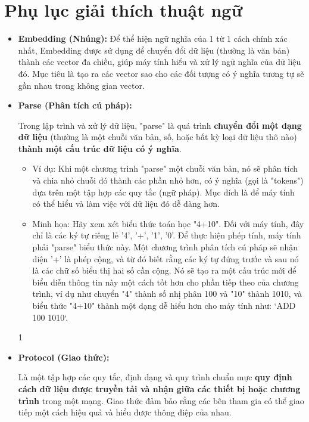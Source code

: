 \documentclass[11pt]{article}
\begin{document}
\section{Phụ lục giải thích thuật ngữ} \label{app:glossary}
\begin{itemize}
	\item \textbf{Embedding (Nhúng):} \label{app:embedding} Để thể hiện ngữ nghĩa của 1 từ 1 cách chính xác nhất, Embedding được sử dụng để chuyển đổi dữ liệu (thường là văn bản) thành các vector đa chiều, giúp máy tính hiểu và xử lý ngữ nghĩa của dữ liệu đó. Mục tiêu là tạo ra các vector sao cho các đối tượng có ý nghĩa tương tự sẽ gần nhau trong không gian vector.

    \item \textbf{Parse (Phân tích cú pháp):} \label{app:parse}
    \begin{boxC}
        Trong lập trình và xử lý dữ liệu, "parse" là quá trình \textbf{chuyển đổi một dạng dữ liệu} (thường là một chuỗi văn bản, số, hoặc bất kỳ loại dữ liệu thô nào) \textbf{thành một cấu trúc dữ liệu có ý nghĩa}.
        \begin{itemize}
            \item Ví dụ: Khi một chương trình "parse" một chuỗi văn bản, nó sẽ phân tích và chia nhỏ chuỗi đó thành các phần nhỏ hơn, có ý nghĩa (gọi là "tokens") dựa trên một tập hợp các quy tắc (ngữ pháp). Mục đích là để máy tính có thể hiểu và làm việc với dữ liệu đó dễ dàng hơn.
            \item Minh họa: Hãy xem xét biểu thức toán học "4+10". Đối với máy tính, đây chỉ là các ký tự riêng lẻ '4', '+', '1', '0'. Để thực hiện phép tính, máy tính phải "parse" biểu thức này. Một chương trình phân tích cú pháp sẽ nhận diện '+' là phép cộng, và từ đó biết rằng các ký tự đứng trước và sau nó là các chữ số biểu thị hai số cần cộng. Nó sẽ tạo ra một cấu trúc mới để biểu diễn thông tin này một cách tốt hơn cho phần tiếp theo của chương trình, ví dụ như chuyển "4" thành số nhị phân 100 và "10" thành 1010, và biểu thức "4+10" thành một dạng dễ hiểu hơn cho máy tính như: `ADD 100 1010`.
        \end{itemize}
    \end{boxC}
1
    \item \textbf{Protocol (Giao thức):} \label{app:protocol}
    \begin{boxC}
        Là một tập hợp các quy tắc, định dạng và quy trình chuẩn mực \textbf{quy định cách dữ liệu được truyền tải và nhận giữa các thiết bị hoặc chương trình} trong một mạng. Giao thức đảm bảo rằng các bên tham gia có thể giao tiếp một cách hiệu quả và hiểu được thông điệp của nhau.
    \end{boxC}


\end{itemize}
\end{document}
